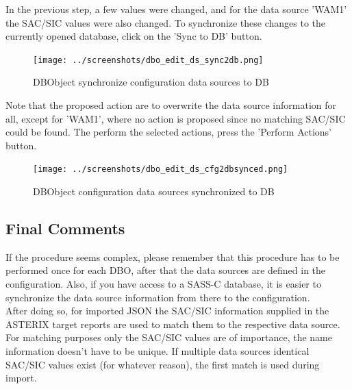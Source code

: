 In the previous step, a few values were changed, and for the data source 'WAM1' the SAC/SIC values were also changed. To synchronize these changes to the currently opened database, click on the 'Sync to DB' button.

\begin{figure}[H]
  \hspace*{-2cm}
    \texttt{[image: ../screenshots/dbo\_edit\_ds\_sync2db.png]}
  \caption{DBObject synchronize configuration data sources to DB}
  \label{fig:dbo_edit_ds_sync2db}
\end{figure}

Note that the proposed action are to overwrite the data source information for all, except for 'WAM1', where no action is proposed since no matching SAC/SIC could be found. The perform the selected actions, press the 'Perform Actions' button.

\begin{figure}[H]
  \hspace*{-2cm}
    \texttt{[image: ../screenshots/dbo\_edit\_ds\_cfg2dbsynced.png]}
  \caption{DBObject configuration data sources synchronized to DB}
  \label{fig:dbo_edit_ds_cfg2dbsynced}
\end{figure}


\subsection{Final Comments}

If the procedure seems complex, please remember that this procedure  has to be performed once for each DBO, after that the data sources are defined in the configuration. Also, if you have access to a SASS-C database, it is easier to synchronize the data source information from there to the configuration. \\

After doing so, for imported JSON the SAC/SIC information supplied in the ASTERIX target reports are used to match them to the respective data source. \\

For matching purposes only the SAC/SIC values are of importance, the name information doesn't have to be unique. If multiple data sources identical SAC/SIC values exist (for whatever reason), the first match is used during import. 
